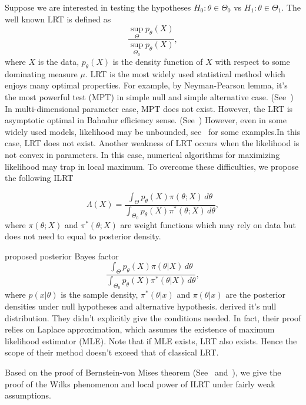 \documentclass[3p]{elsarticle}
\begin{document}
Suppose we are interested in  testing the hypotheses $H_0:\theta\in \Theta_0$ vs $H_1:\theta\in \Theta_1$. The well known LRT is defined as
\begin{equation}
    \frac{\sup_{\Theta} p_{\theta}(X)}{\sup_{\Theta_0} p_\theta(X)},
\end{equation}
where $X$ is the data, $p_\theta(X)$ is the density function of $X$ with respect to some dominating measure $\mu$.
LRT is the most widely used statistical method which enjoys many optimal properties. For example, by Neyman-Pearson lemma, it's the most powerful test (MPT) in simple null and simple alternative case.
(See~\cite{Lehmann}) In multi-dimensional parameter case, MPT does not exist. However, the LRT is asymptotic optimal in Bahadur efficiency sense. (See~\cite{MR0315820}) However, even in some widely used models, likelihood may be unbounded, see~\cite{Cam1990Maximum} for some examples.In this case,
LRT does not exist. Another weakness of LRT occurs when the likelihood is not convex in parameters. In this case, numerical algorithms for maximizing likelihood may trap in local maximum. 
To overcome these difficulties, we propose the following ILRT 

\begin{equation}
    \Lambda (X)=\frac{\int_{\Theta} p_\theta(X)\pi(\theta;X)\,d\theta}{\int_{\Theta_0} p_\theta(X)\pi^*(\theta;X)\,d\theta},
\end{equation}
where $\pi(\theta;X)$ and $\pi^*(\theta;X)$ are weight functions which may rely on data but does not need to equal to posterior density.


\cite{Aitkin1991Posterior} proposed posterior Bayes factor
\begin{equation}
    \frac{\int_{\Theta} p_\theta(X)\pi(\theta|X)\, d\theta}{\int_{\Theta_0}p_\theta(X)\pi^*(\theta|X)\, d\theta},
\end{equation}
where $p(x|\theta)$ is the sample density, $\pi^*(\theta|x)$ and $\pi(\theta|x)$ are the posterior densities under null hypotheses and alternative hypothesis.
\cite{gelfand1993bayesian} derived it's null distribution. They didn't explicitly give the conditions needed. In fact, their proof relies on Laplace approximation, which assumes the existence of maximum likelihood estimator (MLE). 
Note that if MLE exists, LRT also exists. Hence the scope of their method doesn't exceed that of classical LRT\@.



Based on the proof of Bernstein-von Mises theorem (See~\cite{van2000asymptotic} and~\cite{Kleijn2012The}), we give the proof of the Wilks phenomenon and local power of ILRT under fairly weak assumptions.
\end{document}
